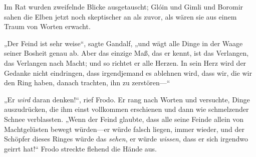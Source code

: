 Im Rat wurden zweifelnde Blicke ausgetauscht; Glóin und Gimli und Boromir sahen die Elben jetzt noch skeptischer an als zuvor, als wären sie aus einem Traum von Worten erwacht.

„Der Feind ist sehr weise“, sagte Gandalf, „und wägt alle Dinge in der Waage seiner Bosheit genau ab. Aber das einzige Maß, das er kennt, ist das Verlangen, das Verlangen nach Macht; und so richtet er alle Herzen. In sein Herz wird der Gedanke nicht eindringen, dass irgendjemand es ablehnen wird, dass wir, die wir den Ring haben, danach trachten, ihn zu zerstören—“

„Er \emph{wird} daran denken!“, rief Frodo. Er rang nach Worten und versuchte, Dinge auszudrücken, die ihm einst vollkommen erschienen und dann wie schmelzender Schnee verblassten.
„Wenn der Feind glaubte, dass alle seine Feinde allein von Machtgelüsten bewegt würden—er würde falsch liegen, immer wieder, und der Schöpfer dieses Ringes würde das \emph{sehen}, er würde \emph{wissen}, dass er sich irgendwo geirrt hat!“ Frodo streckte flehend die Hände aus.

